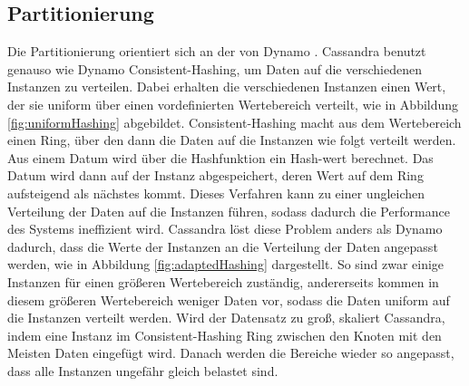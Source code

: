 \subsection{Partitionierung}
Die Partitionierung orientiert sich an der von Dynamo \cite{dynamo}. Cassandra benutzt genauso wie Dynamo Consistent-Hashing, um Daten auf die verschiedenen Instanzen zu verteilen. Dabei erhalten die verschiedenen Instanzen einen Wert, der sie uniform über einen vordefinierten Wertebereich verteilt, wie in Abbildung \ref{fig:uniformHashing} abgebildet. Consistent-Hashing macht aus dem Wertebereich einen Ring, über den dann die Daten auf die Instanzen wie folgt verteilt werden. Aus einem Datum wird über die Hashfunktion ein Hash-wert berechnet. Das Datum wird dann auf der Instanz abgespeichert, deren Wert auf dem Ring aufsteigend als nächstes kommt. Dieses Verfahren kann zu einer ungleichen Verteilung der Daten auf die Instanzen führen, sodass dadurch die Performance des Systems ineffizient wird. Cassandra löst diese Problem anders als Dynamo dadurch, dass die Werte der Instanzen an die Verteilung der Daten angepasst werden, wie in Abbildung \ref{fig:adaptedHashing} dargestellt. So sind zwar einige Instanzen für einen größeren Wertebereich zuständig, andererseits kommen in diesem größeren Wertebereich weniger Daten vor, sodass die Daten uniform auf die Instanzen verteilt werden. Wird der Datensatz zu groß, skaliert Cassandra, indem eine Instanz im Consistent-Hashing Ring zwischen den Knoten mit den Meisten Daten eingefügt wird. Danach werden die Bereiche wieder so angepasst, dass alle Instanzen ungefähr gleich belastet sind.
